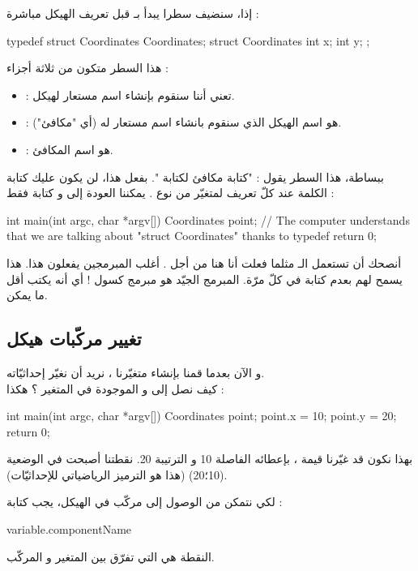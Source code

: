 إذا، سنضيف سطرا يبدأ بـ
قبل تعريف الهيكل مباشرة :
\begin{Csource}
typedef struct Coordinates Coordinates;
struct Coordinates
{
	int x;
	int y;
};
\end{Csource}
هذا السطر متكون من ثلاثة أجزاء :
\begin{itemize}
  \item {} :
  تعني أننا سنقوم بإنشاء اسم مستعار لهيكل.
  \item {} :
  هو اسم الهيكل الذي سنقوم بانشاء اسم مستعار له (أي "مكافئ").
  \item {} :
  هو اسم المكافئ.
\end{itemize}
ببساطة، هذا السطر يقول : "كتابة
مكافئ لكتابة
".
بفعل هذا، لن يكون عليك كتابة الكلمة
عند كلّ تعريف لمتغيّر من نوع
.
يمكننا العودة إلى
و كتابة فقط :
\begin{Csource}
int main(int argc, char *argv[])
{
	 Coordinates point; // The computer understands that we are talking about "struct Coordinates" thanks to typedef
   return 0;
}
\end{Csource}
أنصحك أن تستعمل الـ
مثلما فعلت أنا هنا من أجل
.
أغلب المبرمجين يفعلون هذا. هذا يسمح لهم بعدم كتابة
في كلّ مرّة. المبرمج الجيّد هو مبرمج كسول ! أي أنه يكتب أقل ما يمكن.

\subsection{تغيير مركّبات هيكل}
و الآن بعدما قمنا بإنشاء متغيّرنا
،
نريد أن نغيّر إحداثيّاته.\\
كيف نصل إلى
و
الموجودة في المتغير
؟ هكذا :
\begin{Csource}
int main(int argc, char *argv[])
{
	Coordinates point;
	point.x = 10;
	point.y = 20;
	return 0;
}
\end{Csource}
بهذا نكون قد غيّرنا قيمة
،
بإعطائه الفاصلة 10 و الترتيبة 20. نقطتنا أصبحت في الوضعية (10؛20) (هذا هو الترميز الرياضياتي للإحداثيّات).

لكي نتمكن من الوصول إلى مركّب في الهيكل، يجب كتابة :
\begin{Csource}
  variable.componentName
\end{Csource}
النقطة هي التي تفرّق بين المتغير و المركّب.

